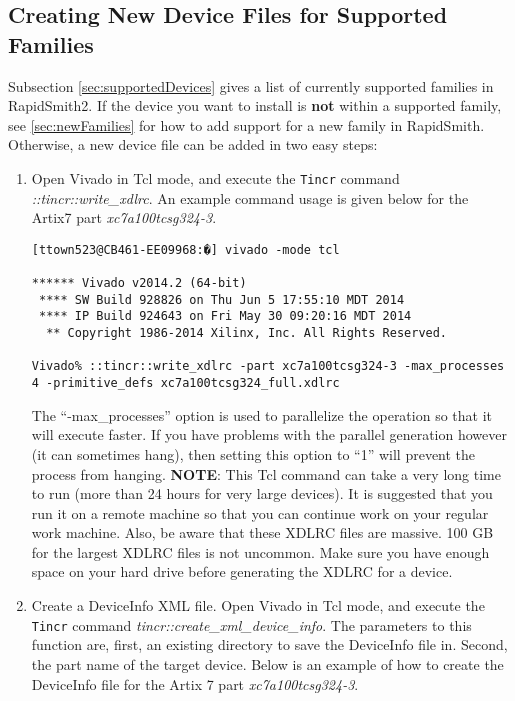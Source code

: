 \subsection{Creating New Device Files for Supported Families} \label{sec:creatingNewSupportedDevices} 
Subsection \ref{sec:supportedDevices} gives a list of currently supported
families in RapidSmith2. If the device you want to install is \textbf{not} within a
supported family, see \autoref{sec:newFamilies} for how to add support for a
new family in RapidSmith. Otherwise, a new device file can be added in two easy
steps:

\begin {enumerate}
\item Open Vivado in Tcl mode, and execute the \texttt{Tincr} command
\textit{::tincr::write\_xdlrc}. An example command usage is given below for the
Artix7 part \textit{xc7a100tcsg324-3}.

\begin{lstlisting}[numbers=none]
[ttown523@CB461-EE09968:�] vivado -mode tcl

****** Vivado v2014.2 (64-bit)
 **** SW Build 928826 on Thu Jun 5 17:55:10 MDT 2014
 **** IP Build 924643 on Fri May 30 09:20:16 MDT 2014
  ** Copyright 1986-2014 Xilinx, Inc. All Rights Reserved.

Vivado% ::tincr::write_xdlrc -part xc7a100tcsg324-3 -max_processes 4 -primitive_defs xc7a100tcsg324_full.xdlrc
\end{lstlisting}

\noindent The ``-max\_processes'' option is used to parallelize the operation so
that it will execute faster. If you have problems with the parallel generation
however (it can sometimes hang), then setting this option to ``1'' will
prevent the process from hanging. \textbf{NOTE}: This Tcl command can take a
very long time to run (more than 24 hours for very large devices). It is
suggested that you run it on a remote machine so that you can continue work on
your regular work machine. Also, be aware that these XDLRC files are massive. 100 GB
for the largest XDLRC files is not uncommon. Make sure you have enough space on
your hard drive before generating the XDLRC for a device.

\item Create a DeviceInfo XML file. Open Vivado in Tcl mode, and execute the
\texttt{Tincr} command \textit{tincr::create\_xml\_device\_info}. The parameters
to this function are, first, an existing directory to save the DeviceInfo file
in.
Second, the part name of the target device. Below is an example of how to create
the DeviceInfo file for the Artix 7 part \textit{xc7a100tcsg324-3}.


\end{enumerate}
